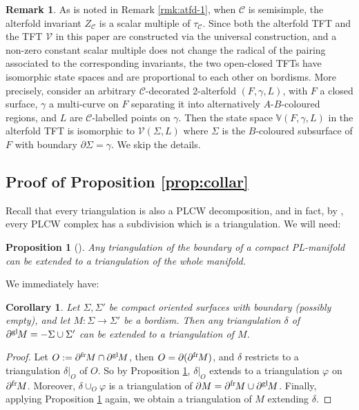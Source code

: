 \documentclass[11pt]{amsart}
\newtheorem{cor}[thm]{Corollary}
\newtheorem{prop}[thm]{Proposition}
\theoremstyle{definition}
\newtheorem{remark}[thm]{Remark}
\numberwithin{equation}{section}
\def\bd{{\partial}}
\newcommand{\bdf}[1]{{\bd^{\operatorname{fr}}\hspace{-1pt}{#1}}}
\newcommand{\bdg}[1]{{\bd^{\operatorname{gl}}\hspace{-1pt}{#1}}}
\def\vphi{\varphi}
\def\ourV{\cV}
\def\cC{\mathcal{C}}
\def\cV{\mathcal{V}}
\def\de{\delta}
\def\to{\rightarrow}
\begin{document}
\begin{remark}\label{rmk:atfd-2}
As is noted in Remark \ref{rmk:atfd-1}, when $\cC$ is semisimple, the alterfold invariant $Z_{\cC}$ is a scalar multiple of $\tau_{\cC}$. Since both the alterfold TFT \cite{atfd2} and the TFT $\ourV$ in this paper are constructed via the universal construction, and a non-zero constant scalar multiple does not change the radical of the pairing associated to the corresponding invariants, the two open-closed TFTs have isomorphic state spaces and are proportional to each other on bordisms.
More precisely, consider an arbitrary $\cC$-decorated 2-alterfold $(F, \gamma, L)$, with $F$ a closed surface, $\gamma$ a multi-curve on $F$ separating it into alternatively $A$-$B$-coloured regions, and $L$ are $\cC$-labelled points on $\gamma$. Then the state space $\mathbb{V}(F, \gamma, L)$ in the alterfold TFT is isomorphic to $\ourV(\Sigma, L)$ where $\Sigma$ is the $B$-coloured subsurface of $F$ with boundary $\bd\Sigma = \gamma$. We skip the details.
\end{remark}


\subsection{Proof of Proposition \ref{prop:collar}}\label{sec:collar-pf}
Recall that every triangulation is also a PLCW decomposition, and in fact, by \cite[Thm.\,6.3]{Kir12}, every PLCW complex has a subdivision which is a triangulation. 
We will need:

\begin{prop}[{\cite[Cor.\,1]{Arm67}}]\label{prop:ext}
Any triangulation of the boundary of a compact PL-manifold can be extended to a triangulation of the whole manifold.     
\end{prop}

We immediately have:
\begin{cor}\label{cor:ext}
Let $\Sigma,\Sigma'$ be compact oriented surfaces with boundary 
(possibly empty), and let $M: \Sigma \to \Sigma'$ be a bordism. Then any triangulation $\de$ of $\bdg M = -\Sigma \cup \Sigma'$ can be extended to a triangulation of $M$.
\end{cor}
\begin{proof}
Let $O := \bdf M \cap \bdg M$, then $O = \bd(\bdf M)$, and $\de$ restricts to a triangulation $\de|_O$ of $O$. So by Proposition \ref{prop:ext}, $\de|_O$ extends to a triangulation $\vphi$ on $\bdf M$. Moreover, $\de \cup_O \vphi$ is a triangulation of $\bd M = \bdf M \cup \bdg M$. Finally, applying Proposition \ref{prop:ext} again, we obtain a triangulation of $M$ extending $\de$.
\end{proof}
\end{document}
